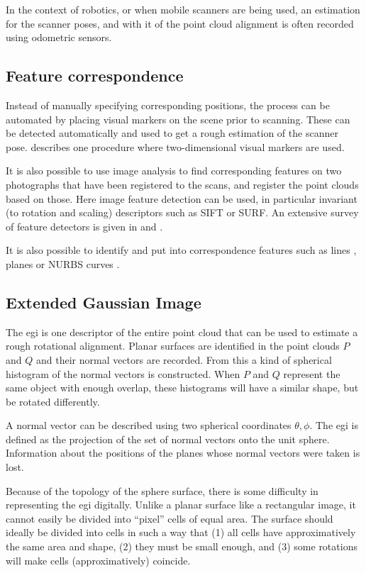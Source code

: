 In the context of robotics, or when mobile scanners are being used, an estimation for the scanner poses, and with it of the point cloud alignment is often recorded using odometric sensors.


\subsection{Feature correspondence}
Instead of manually specifying corresponding positions, the process can be automated by placing visual markers on the scene prior to scanning. These can be detected automatically and used to get a rough estimation of the scanner pose. \cite{Mati2011} describes one procedure where two-dimensional visual markers are used.

It is also possible to use image analysis to find corresponding features on two photographs that have been registered to the scans, and register the point clouds based on those. \cite{Tour2009} Here image feature detection can be used, in particular invariant (to rotation and scaling) descriptors such as SIFT or SURF. An extensive survey of feature detectors is given in \cite{Tuyt2007} and \cite{Saxe2014}.

It is also possible to identify and put into correspondence features such as lines \cite{Lich2011}, planes \cite{Dold2006} or NURBS curves \cite{Koch2008}.


\subsection{Extended Gaussian Image}
The \gls{egi} is one descriptor of the entire point cloud that can be used to estimate a rough rotational alignment. Planar surfaces are identified in the point clouds $P$ and $Q$ and their normal vectors are recorded. \cite{Dold2005} From this a kind of spherical histogram of the normal vectors is constructed. When $P$ and $Q$ represent the same object with enough overlap, these histograms will have a similar shape, but be rotated differently.

A normal vector can be described using two spherical coordinates $\theta, \phi$. The \gls{egi} is defined as the projection of the set of normal vectors onto the unit sphere. \cite{Horn1984} Information about the positions of the planes whose normal vectors were taken is lost.

Because of the topology of the sphere surface, there is some difficulty in representing the \gls{egi} digitally. Unlike a planar surface like a rectangular image, it cannot easily be divided into ``pixel'' cells of equal area. The surface should ideally be divided into cells in such a way that (1) all cells have approximatively the same area and shape, (2) they must be small enough, and (3) some rotations will make cells (approximatively) coincide.

